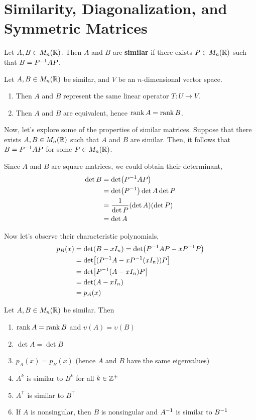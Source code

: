 \newpage
\section{Similarity, Diagonalization, and Symmetric Matrices}
\begin{definition}
Let $A, B \in M_n(\mathbb{R})$. Then $A$ and $B$ are \textbf{similar} if there exists $P \in M_n(\mathbb{R})$ such that $B = P^{-1} AP$.
\end{definition}

\begin{remark}
Let $A, B \in M_n(\mathbb{R})$ be similar, and $V$ be an $n$-dimensional vector space.
\begin{enumerate}
    \item Then $A$ and $B$ represent the same linear operator $T: U \to V$.
    \item Then $A$ and $B$ are equivalent, hence $\rank A = \rank B$.
\end{enumerate}
\end{remark}

\lline

Now, let's explore some of the properties of similar matrices. Suppose that there exists $A, B \in M_n(\mathbb{R})$ such that $A$ and $B$ are similar. Then, it follows that $B = P^{-1} AP$ for some $P \in M_n(\mathbb{R})$.

Since $A$ and $B$ are square matrices, we could obtain their determinant,
\begin{align*}
\det B & = \det(P^{-1} AP) \\
&=\det(P^{-1})\det A \det P \\
&= \frac{1}{\det P}(\det A)(\det P) \\
&=\det A
\end{align*}

Now let's observe their characteristic polynomials,
\begin{align*}
p_B(x) & = \det(B - xI_n) = \det(P^{-1} AP - xP^{-1} P) \\
& = \det[(P^{-1} A - xP^{-1}(xI_n))P] \\
& = \det[P^{-1}(A - xI_n)P] \\
& = \det(A - xI_n) \\
& = p_A(x)
\end{align*}


\begin{theorem}
Let $A, B \in M_n(\mathbb{R})$ be similar. Then
\begin{enumerate}
    \item $\rank A = \rank B$ and $\upsilon(A) = \upsilon(B)$
    \item $\det A = \det B$
    \item $p_A(x) = p_B(x)$ (hence $A$ and $B$ have the same eigenvalues)
    \item $A^k$ is similar to $B^k$ for all $k \in \mathbb{Z}^+$
    \item $A^{\mathsf{T}}$ is similar to $B^{\mathsf{T}}$ 
    \item If $A$ is nonsingular, then $B$ is nonsingular and $A^{-1}$ is similar to $B^{-1}$
\end{enumerate}
\end{theorem}

